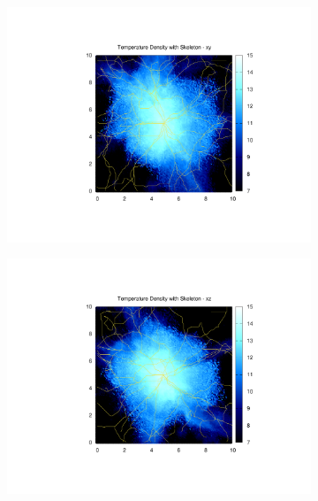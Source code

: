 \documentclass[journal]{IEEEtran}
\begin{document}
\begin{figure}[!t]
\begin{subfigure}[t]{0.3\textwidth}
		\includegraphics[width=\linewidth]{TempDenSkelxy.pdf}
	\end{subfigure}
	\quad
	\begin{subfigure}[t]{0.3\textwidth}
		\centering
		\includegraphics[width=\linewidth]{TempDenSkelxz.pdf}
	\end{subfigure}
	\quad
	\begin{subfigure}[t]{0.3\textwidth}
		\centering

\end{subfigure}
\end{figure}
\end{document}
